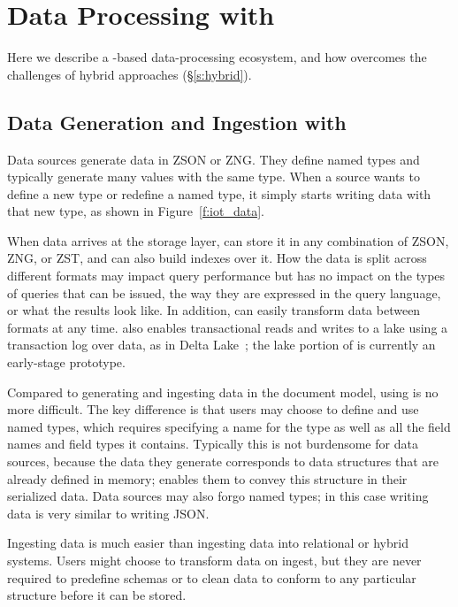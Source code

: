 \vspace{-0.6em}
\section{Data Processing with \sys{}} \label{s:zed_in_action}

Here we describe a \sys{}-based data-processing ecosystem, and how \sys{} overcomes the challenges of hybrid approaches (\S\ref{s:hybrid}).

\vspace{-0.9em}
\subsection{Data Generation and Ingestion with \sys{}}

Data sources generate data in ZSON or ZNG. They define named types and typically generate many values with the same type. When a source wants to define a new type or redefine a named type, it simply starts writing data with that new type, as shown in Figure~\ref{f:iot_data}.

When \sys{} data arrives at the storage layer,
\sys{} can store it in any combination of ZSON, ZNG, or ZST, and can also build indexes over it. How the data is split across different formats may impact query performance but has no impact on the types of queries that can be issued, the way they are expressed in the query language, or what the results look like. In addition, \sys{} can easily transform data between formats at any time. \sys{} also enables transactional reads and writes to a \sys{} lake using a transaction log over \sys{} data, as in Delta Lake~\cite{delta_lake}; the \sys{} lake portion of \sys{} is currently an early-stage prototype.

Compared to generating and ingesting data in the document model, using \sys{} is no more difficult. The key difference is that users may choose to define and use named types, which requires specifying a name for the type as well as all the field names and field types it contains. Typically this is not burdensome for data sources, because the data they generate corresponds to data structures that are already defined in memory; \sys{} enables them to convey this structure in their serialized data. Data sources may also forgo named types; in this case writing \sys{} data is very similar to writing JSON.

Ingesting \sys{} data is much easier than ingesting data into relational or hybrid systems. Users might choose to transform data on ingest, but they are never required to predefine schemas or to clean data to conform to any particular structure before it can be stored.

